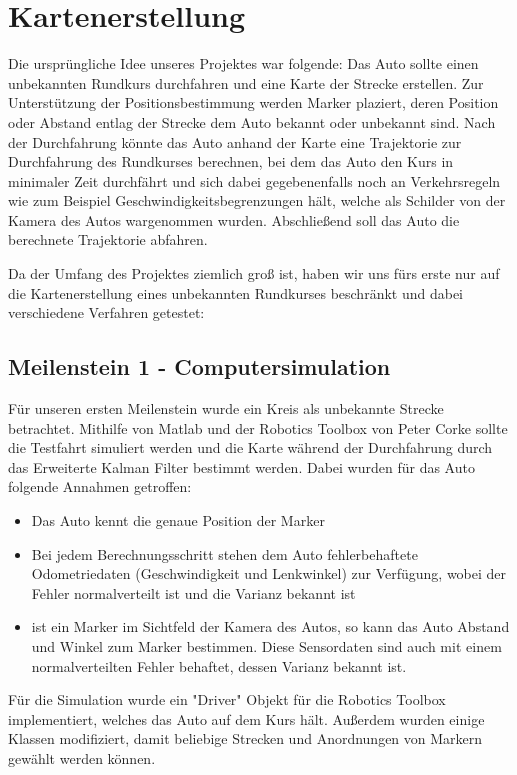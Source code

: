 \section{Kartenerstellung}

Die ursprüngliche Idee unseres Projektes war folgende: Das Auto sollte einen unbekannten Rundkurs durchfahren und eine Karte der Strecke erstellen. Zur Unterstützung der Positionsbestimmung werden Marker plaziert, deren Position oder Abstand entlag der Strecke dem Auto bekannt oder unbekannt sind.
Nach der Durchfahrung könnte das Auto anhand der Karte eine Trajektorie zur Durchfahrung des Rundkurses berechnen, bei dem das Auto den Kurs in minimaler Zeit durchfährt und sich dabei gegebenenfalls noch an Verkehrsregeln wie zum Beispiel Geschwindigkeitsbegrenzungen hält, welche als Schilder von der Kamera des Autos wargenommen wurden.
Abschließend soll das Auto die berechnete Trajektorie abfahren.

Da der Umfang des Projektes ziemlich groß ist, haben wir uns fürs erste nur auf die Kartenerstellung eines unbekannten Rundkurses beschränkt und dabei verschiedene Verfahren getestet:

\subsection{Meilenstein 1 - Computersimulation}

Für unseren ersten Meilenstein wurde ein Kreis als unbekannte Strecke betrachtet. Mithilfe von Matlab und der Robotics Toolbox von Peter Corke sollte die Testfahrt simuliert werden und die Karte während der Durchfahrung durch das Erweiterte Kalman Filter bestimmt werden.
Dabei wurden für das Auto folgende Annahmen getroffen:
\begin{itemize}
 	\item Das Auto kennt die genaue Position der Marker
 	\item Bei jedem Berechnungsschritt stehen dem Auto fehlerbehaftete Odometriedaten (Geschwindigkeit und Lenkwinkel) zur Verfügung, wobei der Fehler normalverteilt ist und die Varianz bekannt ist
 	\item ist ein Marker im Sichtfeld der Kamera des Autos, so kann das Auto Abstand und Winkel zum Marker bestimmen. Diese Sensordaten sind auch mit einem normalverteilten Fehler behaftet, dessen Varianz bekannt ist.
\end{itemize}
Für die Simulation wurde ein "{}Driver"{} Objekt für die Robotics Toolbox implementiert, welches das Auto auf dem Kurs hält. Außerdem wurden einige Klassen modifiziert, damit beliebige Strecken und Anordnungen von Markern gewählt werden können.

